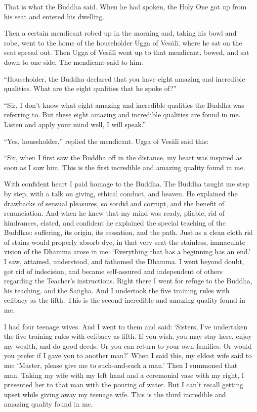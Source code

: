 \documentclass[12pt,openany]{book}%
\begin{document}
That is what the Buddha said. When he had spoken, the Holy One got up from his seat and entered his dwelling. 

Then a certain mendicant robed up in the morning and, taking his bowl and robe, went to the home of the householder Ugga of \textsanskrit{Vesālī}, where he sat on the seat spread out. Then Ugga of \textsanskrit{Vesālī} went up to that mendicant, bowed, and sat down to one side. The mendicant said to him: 

“Householder, the Buddha declared that you have eight amazing and incredible qualities. What are the eight qualities that he spoke of?” 

“Sir, I don’t know what eight amazing and incredible qualities the Buddha was referring to. But these eight amazing and incredible qualities are found in me. Listen and apply your mind well, I will speak.” 

“Yes, householder,” replied the mendicant. Ugga of \textsanskrit{Vesālī} said this: 

“Sir, when I first saw the Buddha off in the distance, my heart was inspired as soon as I saw him. This is the first incredible and amazing quality found in me. 

With confident heart I paid homage to the Buddha. The Buddha taught me step by step, with a talk on giving, ethical conduct, and heaven. He explained the drawbacks of sensual pleasures, so sordid and corrupt, and the benefit of renunciation. And when he knew that my mind was ready, pliable, rid of hindrances, elated, and confident he explained the special teaching of the Buddhas: suffering, its origin, its cessation, and the path. Just as a clean cloth rid of stains would properly absorb dye, in that very seat the stainless, immaculate vision of the Dhamma arose in me: ‘Everything that has a beginning has an end.’ I saw, attained, understood, and fathomed the Dhamma. I went beyond doubt, got rid of indecision, and became self-assured and independent of others regarding the Teacher’s instructions. Right there I went for refuge to the Buddha, his teaching, and the \textsanskrit{Saṅgha}. And I undertook the five training rules with celibacy as the fifth. This is the second incredible and amazing quality found in me. 

I had four teenage wives. And I went to them and said: ‘Sisters, I’ve undertaken the five training rules with celibacy as fifth. If you wish, you may stay here, enjoy my wealth, and do good deeds. Or you can return to your own families. Or would you prefer if I gave you to another man?’ When I said this, my eldest wife said to me: ‘Master, please give me to such-and-such a man.’ Then I summoned that man. Taking my wife with my left hand and a ceremonial vase with my right, I presented her to that man with the pouring of water. But I can’t recall getting upset while giving away my teenage wife. This is the third incredible and amazing quality found in me. 
\end{document}
